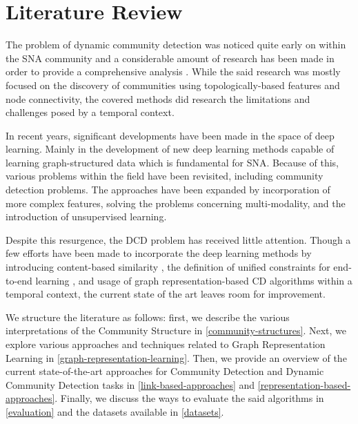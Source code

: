 \documentclass[
acmsmall,
nonacm,
screen,
acmthm]{acmart}
\begin{document}
\hypertarget{literature-review}{%
\section{Literature Review}\label{literature-review}}

The problem of dynamic community detection was noticed quite early on
within the SNA community and a considerable amount of research has been
made in order to provide a comprehensive analysis
\citep{tamimiLiteratureSurveyDynamic2015, rossettiCommunityDiscoveryDynamic2018, dakicheTrackingCommunityEvolution2019}.
While the said research was mostly focused on the discovery of
communities using topologically-based features and node connectivity,
the covered methods did research the limitations and challenges posed by
a temporal context.

In recent years, significant developments have been made in the space of
deep learning. Mainly in the development of new deep learning methods
capable of learning graph-structured data
\citep{bronsteinGeometricDeepLearning2017, hamiltonRepresentationLearningGraphs2018, kipfSemiSupervisedClassificationGraph2017}
which is fundamental for SNA. Because of this, various problems within
the field have been revisited, including community detection problems.
The approaches have been expanded by incorporation of more complex
features, solving the problems concerning multi-modality, and the
introduction of unsupervised learning.

Despite this resurgence, the DCD problem has received little attention.
Though a few efforts have been made to incorporate the deep learning
methods by introducing content-based similarity
\citep{faniUserCommunityDetection2020, cazabetUsingDynamicCommunity2012, huangInformationFusionOriented2022},
the definition of unified constraints for end-to-end learning
\citep{maCommunityawareDynamicNetwork2020, wangEvolutionaryAutoencoderDynamic2020, cavallariLearningCommunityEmbedding2017, jiaCommunityGANCommunityDetection2019},
and usage of graph representation-based CD algorithms
\citep{wangVehicleTrajectoryClustering2020, limBlackHoleRobustCommunity2016}
within a temporal context, the current state of the art leaves room for
improvement.

We structure the literature as follows: first, we describe the various
interpretations of the Community Structure in
\cref{community-structures}. Next, we explore various approaches and
techniques related to Graph Representation Learning in
\cref{graph-representation-learning}. Then, we provide an overview of
the current state-of-the-art approaches for Community Detection and
Dynamic Community Detection tasks in \cref{link-based-approaches} and
\cref{representation-based-approaches}. Finally, we discuss the ways to
evaluate the said algorithms in \cref{evaluation} and the datasets
available in \cref{datasets}.
\end{document}
